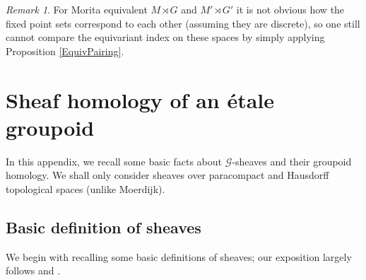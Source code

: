 \documentclass[a4paper]{amsart}
\newcommand{\ch}{\operatorname{ch}}
\newcommand{\CC}{\mathbb C}
\newcommand{\ind}{\operatorname{ind}}
\newcommand{\maG}{\mathcal G}
\newcommand\<{\langle}
\renewcommand\>{\rangle}
\theoremstyle{definition}
\theoremstyle{remark}
\newtheorem{rem}[theorem]{Remark}
\begin{document}
%

\begin{rem}
For Morita equivalent $M \rtimes G$ and $M' \rtimes G'$ it is not obvious how the fixed point sets correspond to each other
(assuming they are discrete),
so one still cannot compare the equivariant index on these spaces by simply applying Proposition \ref{EquivPairing}.
\end{rem}


\appendix

\section{Sheaf homology of an \'etale groupoid}
In this appendix, we recall some basic facts about $\maG$-sheaves and their groupoid homology.
We shall only consider sheaves over paracompact and Hausdorff topological spaces (unlike Moerdijk).

\subsection{Basic definition of sheaves}
We begin with recalling some basic definitions of sheaves;
our exposition largely follows \cite[Chapter 10]{GallierQuaintanceBook25} and \cite[Chapter 2]{KashiwaraShapiraBook90}.
\end{document}
